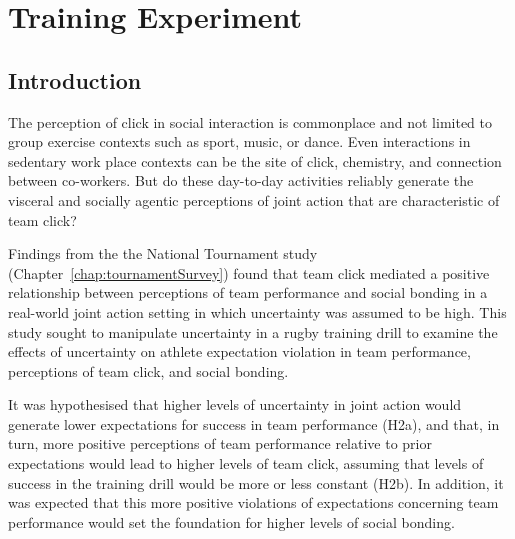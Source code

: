 

\begin{savequote}[8cm]

  \qauthor{}
\end{savequote}



\chapter{\label{chap:trainingExperiment}Training Experiment}



                                          \begin{CJK}{UTF8}{gbsn}







\minitoc


\section{Introduction}
The perception of click in social interaction is commonplace and not limited to group exercise contexts such as sport, music, or dance.  Even interactions in sedentary work place contexts can be the site of click, chemistry, and connection between co-workers.   But do these day-to-day activities reliably generate the visceral and socially agentic perceptions of joint action that are characteristic of team click?

Findings from the the National Tournament study (Chapter~\ref{chap:tournamentSurvey}) found that team click mediated a positive relationship between perceptions of team performance and social bonding in a real-world joint action setting in which uncertainty was assumed to be high.  This study sought to manipulate uncertainty in a rugby training drill to examine the effects of uncertainty on athlete expectation violation in team performance, perceptions of team click, and social bonding.

It was hypothesised that higher levels of uncertainty in joint action would generate lower expectations for success in team performance (H2a), and that, in turn, more positive perceptions of team performance relative to prior expectations would lead to higher levels of team click, assuming that levels of success in the training drill would be more or less constant (H2b).  In addition, it was expected that this more positive violations of expectations concerning team performance would set the foundation for higher levels of social bonding.


\end{CJK}
